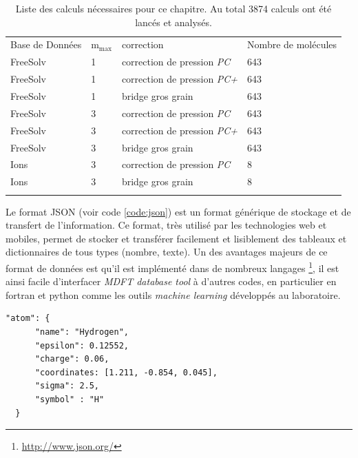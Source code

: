 \begin{table}[h]
  \begin{tabular}{ l l l l }
    \hline & \\[-1em]\hline
    Base de Données & $\mathrm{m}_\mathrm{max}$   & correction & Nombre de molécules \\
    \hline
    FreeSolv  & 1 & correction de pression \textit{PC} & 643 \\
    FreeSolv  & 1 & correction de pression \textit{PC+} & 643 \\
    FreeSolv  & 1 & bridge gros grain & 643 \\
    FreeSolv  & 3 & correction de pression \textit{PC} & 643 \\
    FreeSolv  & 3 & correction de pression \textit{PC+} & 643 \\
    FreeSolv  & 3 & bridge gros grain & 643 \\
    \hline
    Ions  & 3 & correction de pression \textit{PC} & 8 \\
    Ions  & 3 & bridge gros grain & 8 \\
    \hline & \\[-1em]\hline
  \end{tabular}
  \caption[Liste des benchmark lancés.]{Liste des calculs nécessaires pour ce chapitre. Au total 3874 calculs ont été lancés et analysés.}
  \label{tab:calculs_lances}  
\end{table}



Le format JSON (voir code \ref{code:json}) est un format générique de stockage et de transfert de l'information. Ce format, très utilisé par les technologies web et mobiles, permet de stocker et transférer facilement et lisiblement des tableaux et dictionnaires de tous types (nombre, texte). Un des avantages majeurs de ce format de données est qu'il est implémenté dans de nombreux langages \footnote{\url{http://www.json.org/}}, il est ainsi facile d'interfacer \textit{MDFT database tool} à d'autres codes, en particulier en fortran et python comme les outils \textit{machine learning} développés au laboratoire. 


\begin{lstlisting}[caption={Exemple de fichier json. Ici on décrit un atome, son nom, son symbole, sa position ainsi que ses paramètres de champ de force.}, label={code:json},captionpos=b]
  "atom": {
      "name": "Hydrogen", 
      "epsilon": 0.12552, 
      "charge": 0.06, 
      "coordinates: [1.211, -0.854, 0.045],  
      "sigma": 2.5,
      "symbol" : "H"
  }
\end{lstlisting}






